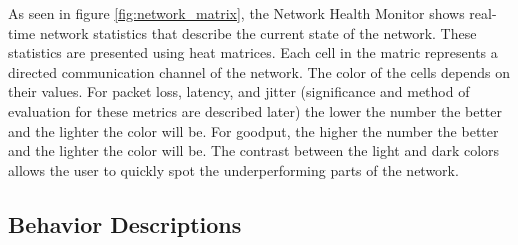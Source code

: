\documentclass[letterpaper,twocolumn,12pt]{article}
\begin{document}

As seen in figure \ref{fig:network_matrix}, the Network Health Monitor shows real-time network statistics that describe the current state of the network. These statistics are presented using heat matrices. Each cell in the matric represents a directed communication channel of the network. The color of the cells depends on their values. For packet loss, latency, and jitter (significance and method of evaluation for these metrics are described later) the lower the number the better and the lighter the color will be. For goodput, the higher the number the better and the lighter the color will be. The contrast between the light and dark colors allows the user to quickly spot the underperforming parts of the network.

\subsection{Behavior Descriptions}
\end{document}
